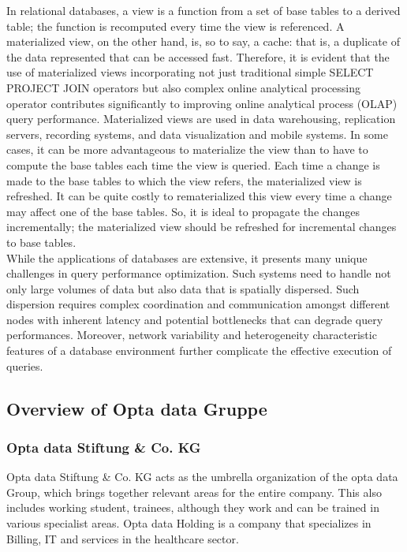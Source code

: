In relational databases, a view is a function from a set of base tables to a derived table; the function is recomputed every time the view is referenced. A materialized view, on the other hand, is, so to say, a cache: that is, a duplicate of the data represented that can be accessed fast. Therefore, it is evident that the use of materialized views incorporating not just traditional simple SELECT PROJECT JOIN operators but also complex online analytical processing operator contributes significantly to improving online analytical process (OLAP) query performance. Materialized views are used in data warehousing, replication servers, recording systems, and data visualization and mobile systems. In some cases, it can be more advantageous to materialize the view than to have to compute the base tables each time the view is queried. Each time a change is made to the base tables to which the view refers, the materialized view is refreshed. It can be quite costly to rematerialized this view every time a change may affect one of the base tables. So, it is ideal to propagate the changes incrementally; the materialized view should be refreshed for incremental changes to base tables.\cite{Data_warehousing,efficient_incremental,rashid2009role}\\
While the applications of databases are extensive, it presents many unique challenges in query performance optimization. Such systems need to handle not only large volumes of data but also data that is spatially dispersed. Such dispersion requires complex coordination and communication amongst different nodes with inherent latency and potential bottlenecks that can degrade query performances. Moreover, network variability and heterogeneity characteristic features of a database environment further complicate the effective execution of queries.

\subsection{Overview of Opta data Gruppe}
\subsubsection{Opta data Stiftung \& Co. KG }
Opta data Stiftung \& Co. KG acts as the umbrella organization of the opta data Group, which brings together relevant areas for the entire company. This also includes working student, trainees, although they work and can be trained in various specialist areas. Opta data Holding is a company that specializes in Billing, IT and services in the healthcare sector.

